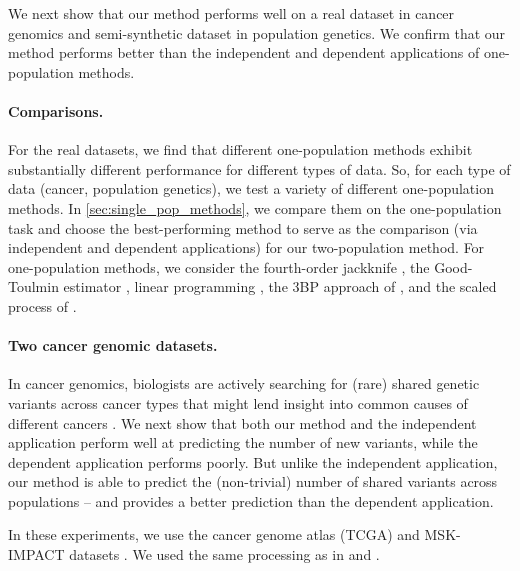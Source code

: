 
We next show that our method performs well on a real dataset in cancer genomics and semi-synthetic dataset in population genetics. We confirm that our method performs better than the independent and dependent applications of one-population methods.

\paragraph{Comparisons.} For the real datasets, we find that different one-population methods exhibit substantially different performance for different types of data. So, for each type of data (cancer, population genetics), we test a variety of different one-population methods. In \cref{sec:single_pop_methods}, we compare them on the one-population task and choose the best-performing method to serve as the comparison (via independent and dependent applications) for our two-population method.  For one-population methods, we consider the fourth-order jackknife \citep{burnham1978estimation, gravel2014predicting}, the Good-Toulmin estimator \citep{Orlitsky2016,chakraborty2019using}, linear programming \citep{zou2016quantifying}, the 3BP approach of \citet{Masoero2022}, and the scaled process of \citet{Camerlenghi2021}.


\paragraph{Two cancer genomic datasets.}
%
In cancer genomics, biologists are actively searching for (rare) shared genetic variants across cancer types that might lend insight into common causes of different cancers \citep{bojesen2013multiple, rashkin2020pan}. We next show that both our method and the independent application perform well at predicting the number of new variants, while the dependent application performs poorly. But unlike the independent application, our method is able to predict the (non-trivial) number of shared variants across populations -- and provides a better prediction than the dependent application.

In these experiments, we use the cancer genome atlas (TCGA) and MSK-IMPACT datasets \citep{cancer2008comprehensive, cancer2013cancer, cheng2015memorial}. 
We used the same processing as in \citet{chakraborty2019using} and \citet{Masoero2022}. 

